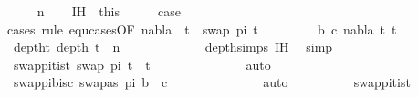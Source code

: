 \begin{isabellebody}
\ \ \isamarkupfalse%
\ {\isacharparenleft}{\kern0pt}{}\ n{\isacharparenright}{\kern0pt}\isanewline
\ \ \isamarkupfalse%
\ IH\ {\isacharequal}{\kern0pt}\ this\isanewline
\ \ \isamarkupfalse%
\ \isamarkupfalse%
\ {\isacharquery}{\kern0pt}case\ \isanewline
\ \ \ \ \isamarkupfalse%
{\isacharparenleft}{\kern0pt}cases\ rule{\isacharcolon}{\kern0pt}\ equ{\isachardot}{\kern0pt}cases{\isacharbrackleft}{\kern0pt}OF\ {\isacartoucheopen}nabla\ {\isasymturnstile}\ t\ {\isasymapprox}\ swap\ pi\ t{\isacartoucheclose}{\isacharbrackright}{\kern0pt}{\isacharparenright}{\kern0pt}\isanewline
\ \ \ \ \ \ \isamarkupfalse%
\ {\isacharparenleft}{\kern0pt}{}\ b\ c\ nabla\ t{}\ t{}{\isacharparenright}{\kern0pt}\isanewline
\ \ \ \ \ \ \ \ \isamarkupfalse%
\ deptht{}{\isacharcolon}{\kern0pt}\ {\isachardoublequoteopen}depth\ t{}\ {\isacharless}{\kern0pt}\ n{\isachardoublequoteclose}\isanewline
\ \ \ \ \ \ \ \ \ \ \isamarkupfalse%
\ {}\ depth{\isachardot}{\kern0pt}simps{\isacharparenleft}{\kern0pt}{}{\isacharparenright}{\kern0pt}\ IH\ \isamarkupfalse%
\ simp\isanewline
\ \ \ \ \ \ \ \ \isamarkupfalse%
\ swap{\isacharunderscore}{\kern0pt}pi{\isacharunderscore}{\kern0pt}t{}{\isacharunderscore}{\kern0pt}is{\isacharunderscore}{\kern0pt}t{}{\isacharcolon}{\kern0pt}\ {\isachardoublequoteopen}swap\ pi\ t{}\ {\isacharequal}{\kern0pt}\ t{}{\isachardoublequoteclose}\isanewline
\ \ \ \ \ \ \ \ \ \ \isamarkupfalse%
\ {}{\isacharparenleft}{\kern0pt}{}{\isacharcomma}{\kern0pt}{}{\isacharparenright}{\kern0pt}\ \isamarkupfalse%
\ auto\isanewline
\ \ \ \ \ \ \ \ \isamarkupfalse%
\ swap{\isacharunderscore}{\kern0pt}pi{\isacharunderscore}{\kern0pt}b{\isacharunderscore}{\kern0pt}is{\isacharunderscore}{\kern0pt}c{\isacharcolon}{\kern0pt}\ {\isachardoublequoteopen}swapas\ pi\ b\ {\isacharequal}{\kern0pt}\ c{\isachardoublequoteclose}\isanewline
\ \ \ \ \ \ \ \ \ \ \isamarkupfalse%
\ {}{\isacharparenleft}{\kern0pt}{}{\isacharcomma}{\kern0pt}{}{\isacharparenright}{\kern0pt}\ \isamarkupfalse%
\ auto\isanewline
\ \ \ \ \ \ \ \ \isamarkupfalse%
\ swap{\isacharunderscore}{\kern0pt}pi{\isacharunderscore}{\kern0pt}t{}{\isacharunderscore}{\kern0pt}is{\isacharunderscore}{\kern0pt}t{}\ \isamarkupfalse%

\end{isabellebody}
